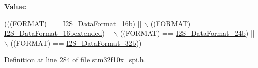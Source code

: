 {\bfseries Value\+:}
\begin{DoxyCode}
(((FORMAT) == \hyperlink{group___i2_s___data___format_gabcd7cb799b68346a735709cc135bd414}{I2S\_DataFormat\_16b}) || \(\backslash\)
                                    ((FORMAT) == \hyperlink{group___i2_s___data___format_gae44b9704c9e393d5abec9bf4fcfe1116}{I2S\_DataFormat\_16bextended}) || \(\backslash\)
                                    ((FORMAT) == \hyperlink{group___i2_s___data___format_ga5a959486671cf00c5a734f1df205581b}{I2S\_DataFormat\_24b}) || \(\backslash\)
                                    ((FORMAT) == \hyperlink{group___i2_s___data___format_ga6be3bdcc713cb92a9ad247de013a5e37}{I2S\_DataFormat\_32b}))
\end{DoxyCode}


Definition at line 284 of file stm32f10x\+\_\+spi.\+h.

